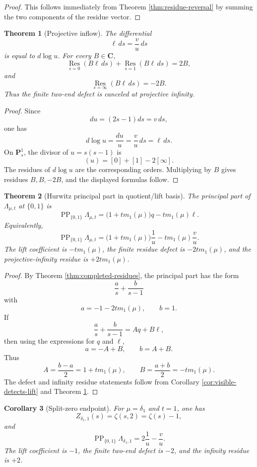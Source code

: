 \documentclass[11pt]{article}
\newcommand{\C}{\mathbf C}
\newcommand{\PP}{\operatorname{PP}}
\newcommand{\Res}{\operatorname*{Res}}
\theoremstyle{plain}
\newtheorem{theorem}{Theorem}[section]
\newtheorem{corollary}[theorem]{Corollary}
\theoremstyle{definition}
\begin{document}
\begin{proof}
This follows immediately from Theorem \ref{thm:residue-reversal} by summing the two components of the residue vector.
\end{proof}

\begin{theorem}[Projective inflow]\label{thm:projective-inflow}
The differential
\[
   \ell\,ds=\frac vu\,ds
\]
is equal to \(d\log u\).  For every \(B\in\C\),
\[
   \Res_{s=0}(B\ell\,ds)+\Res_{s=1}(B\ell\,ds)=2B,
\]
and
\[
   \Res_{s=\infty}(B\ell\,ds)=-2B.
\]
Thus the finite two-end defect is canceled at projective infinity.
\end{theorem}

\begin{proof}
Since
\[
   du=(2s-1)ds=v\,ds,
\]
one has
\[
   d\log u=\frac{du}{u}=\frac vu\,ds=\ell\,ds.
\]
On \(\mathbf P^1_s\), the divisor of \(u=s(s-1)\) is
\[
   (u)=[0]+[1]-2[\infty].
\]
The residues of \(d\log u\) are the corresponding orders.  Multiplying by \(B\) gives residues \(B,B,-2B\), and the displayed formulas follow.
\end{proof}

\begin{theorem}[Hurwitz principal part in quotient/lift basis]\label{thm:hurwitz-pp}
The principal part of \(\Lambda_{\mu,t}\) at \(\{0,1\}\) is
\[
   \PP_{\{0,1\}}\Lambda_{\mu,t}
   =\bigl(1+t m_1(\mu)\bigr)q-tm_1(\mu)\ell.
\]
Equivalently,
\[
   \PP_{\{0,1\}}\Lambda_{\mu,t}
   =\bigl(1+t m_1(\mu)\bigr)\frac1u-tm_1(\mu)\frac vu.
\]
The lift coefficient is \(-t m_1(\mu)\), the finite residue defect is \(-2t m_1(\mu)\), and the projective-infinity residue is \(+2t m_1(\mu)\).
\end{theorem}

\begin{proof}
By Theorem \ref{thm:completed-residues}, the principal part has the form
\[
   \frac a s+\frac b{s-1}
\]
with
\[
   a=-1-2tm_1(\mu),
   \qquad
   b=1.
\]
If
\[
   \frac a s+\frac b{s-1}=Aq+B\ell,
\]
then using the expressions for \(q\) and \(\ell\),
\[
   a=-A+B,
   \qquad
   b=A+B.
\]
Thus
\[
   A=\frac{b-a}{2}=1+tm_1(\mu),
   \qquad
   B=\frac{a+b}{2}=-tm_1(\mu).
\]
The defect and infinity residue statements follow from Corollary \ref{cor:visible-detects-lift} and Theorem \ref{thm:projective-inflow}.
\end{proof}

\begin{corollary}[Split-zero endpoint]\label{cor:split-zero-endpoint}
For \(\mu=\delta_1\) and \(t=1\), one has
\[
   Z_{\delta_1,1}(s)=\zeta(s,2)=\zeta(s)-1,
\]
and
\[
   \PP_{\{0,1\}}\Lambda_{\delta_1,1}=2\frac1u-\frac vu.
\]
The lift coefficient is \(-1\), the finite two-end defect is \(-2\), and the infinity residue is \(+2\).
\end{corollary}
\end{document}

